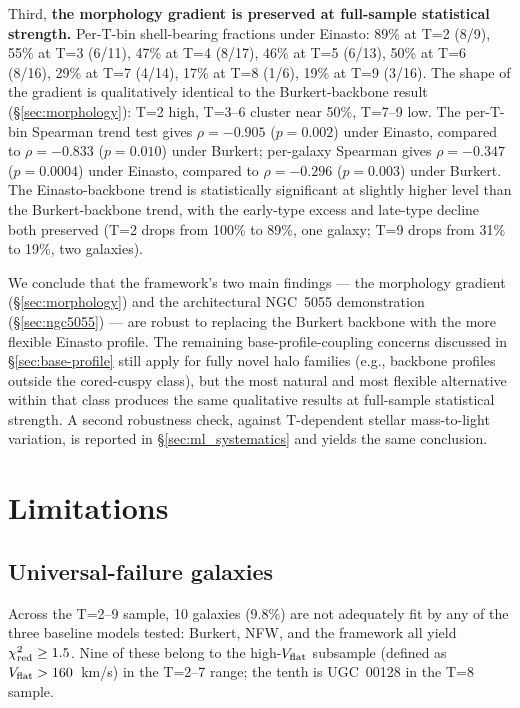 Third, \textbf{the morphology gradient is preserved at full-sample statistical strength.} Per-T-bin shell-bearing fractions under Einasto: 89\% at T=2 (8/9), 55\% at T=3 (6/11), 47\% at T=4 (8/17), 46\% at T=5 (6/13), 50\% at T=6 (8/16), 29\% at T=7 (4/14), 17\% at T=8 (1/6), 19\% at T=9 (3/16). The shape of the gradient is qualitatively identical to the Burkert-backbone result (\S\ref{sec:morphology}): T=2 high, T=3--6 cluster near 50\%, T=7--9 low. The per-T-bin Spearman trend test gives $\rho = -0.905$ ($p = 0.002$) under Einasto, compared to $\rho = -0.833$ ($p = 0.010$) under Burkert; per-galaxy Spearman gives $\rho = -0.347$ ($p = 0.0004$) under Einasto, compared to $\rho = -0.296$ ($p = 0.003$) under Burkert. The Einasto-backbone trend is statistically significant at slightly higher level than the Burkert-backbone trend, with the early-type excess and late-type decline both preserved (T=2 drops from 100\% to 89\%, one galaxy; T=9 drops from 31\% to 19\%, two galaxies).

We conclude that the framework's two main findings --- the morphology gradient (\S\ref{sec:morphology}) and the architectural NGC~5055 demonstration (\S\ref{sec:ngc5055}) --- are robust to replacing the Burkert backbone with the more flexible Einasto profile. The remaining base-profile-coupling concerns discussed in \S\ref{sec:base-profile} still apply for fully novel halo families (e.g., backbone profiles outside the cored-cuspy class), but the most natural and most flexible alternative within that class produces the same qualitative results at full-sample statistical strength. A second robustness check, against T-dependent stellar mass-to-light variation, is reported in \S\ref{sec:ml_systematics} and yields the same conclusion.

\section{Limitations}
\label{sec:limitations}

\subsection{Universal-failure galaxies}
\label{sec:universal}

Across the T=2--9 sample, 10 galaxies (9.8\%) are not adequately fit by any of the three baseline models tested: Burkert, NFW, and the framework all yield $\chi^2_{\rm red} \geq 1.5$. Nine of these belong to the high-$V_{\rm flat}$ subsample (defined as $V_{\rm flat} > 160$~km/s) in the T=2--7 range; the tenth is UGC~00128 in the T=8 sample.

